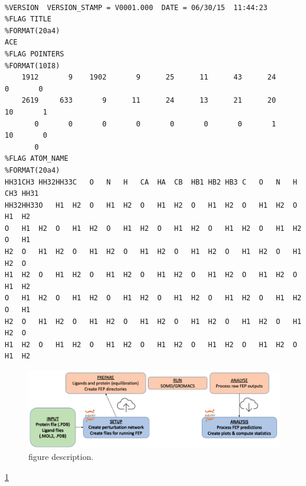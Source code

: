 {\scriptsize
\begin{lstlisting}[columns=flexible]

%VERSION  VERSION_STAMP = V0001.000  DATE = 06/30/15  11:44:23                  
%FLAG TITLE                                                                     
%FORMAT(20a4)                                                                   
ACE                                                                             
%FLAG POINTERS                                                                  
%FORMAT(10I8)                                                                   
    1912       9    1902       9      25      11      43      24       0       0
    2619     633       9      11      24      13      21      20      10       1
       0       0       0       0       0       0       0       1      10       0
       0
%FLAG ATOM_NAME                                                                 
%FORMAT(20a4)                                                                   
HH31CH3 HH32HH33C   O   N   H   CA  HA  CB  HB1 HB2 HB3 C   O   N   H   CH3 HH31
HH32HH33O   H1  H2  O   H1  H2  O   H1  H2  O   H1  H2  O   H1  H2  O   H1  H2  
O   H1  H2  O   H1  H2  O   H1  H2  O   H1  H2  O   H1  H2  O   H1  H2  O   H1  
H2  O   H1  H2  O   H1  H2  O   H1  H2  O   H1  H2  O   H1  H2  O   H1  H2  O   
H1  H2  O   H1  H2  O   H1  H2  O   H1  H2  O   H1  H2  O   H1  H2  O   H1  H2  
O   H1  H2  O   H1  H2  O   H1  H2  O   H1  H2  O   H1  H2  O   H1  H2  O   H1  
H2  O   H1  H2  O   H1  H2  O   H1  H2  O   H1  H2  O   H1  H2  O   H1  H2  O   
H1  H2  O   H1  H2  O   H1  H2  O   H1  H2  O   H1  H2  O   H1  H2  O   H1  H2 
\end{lstlisting}
}

\begin{figure}[htp]
\includegraphics[width=\linewidth]{04_fep/inputs/tut_imgs/fep_pipeline.png}
\caption{figure description.}
\label{label_of_figure}
\end{figure}

\ref{label_of_figure}